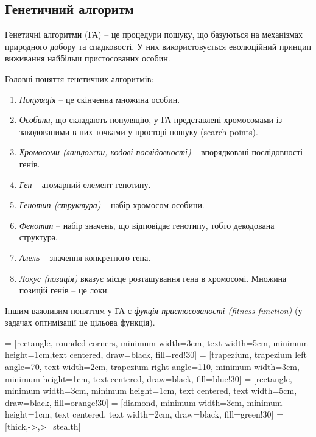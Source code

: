 \subsection*{Генетичний алгоритм}

Генетичні алгоритми (ГА) -- це процедури пошуку, що базуються на механізмах природного добору та спадковості.
У них використовується еволюційний принцип виживання найбільш пристосованих особин.

Головні поняття генетичних алгоритмів:
\begin{enumerate}
    \item \emph{Популяція} -- це скінченна множина особин.
    \item \emph{Особини}, що складають популяцію, у ГА представлені хромосомами із закодованими в них
    точками у просторі пошуку (search points).
    \item \emph{Хромосоми (ланцюжки, кодові послідовності)} -- впорядковані послідовності генів.
    \item \emph{Ген} -- атомарний елемент генотипу.
    \item \emph{Генотип (структура)} -- набір хромосом особини.
    \item \emph{Фенотип} -- набір значень, що відповідає генотипу, тобто декодована структура.
    \item \emph{Алель} -- значення конкретного гена.
    \item \emph{Локус (позиція)} вказує місце розташування гена в хромосомі.
    Множина позицій генів -- це локи.
\end{enumerate}

Іншим важливим поняттям у ГА є \emph{фукція пристосованості (fitness function)}
(у задачах оптимізації це цільова функція).

\usetikzlibrary{shapes.geometric, arrows}
 = [rectangle, rounded corners, minimum width=3cm, text width=5cm, minimum height=1cm,text centered, draw=black, fill=red!30]
 = [trapezium, trapezium left angle=70, text width=2cm, trapezium right angle=110, minimum width=3cm, minimum height=1cm, text centered, draw=black, fill=blue!30]
 = [rectangle, minimum width=3cm, minimum height=1cm, text centered, text width=5cm, draw=black, fill=orange!30]
 = [diamond, minimum width=3cm, minimum height=1cm, text centered, text width=2cm, draw=black, fill=green!30]
 = [thick,->,>=stealth]

